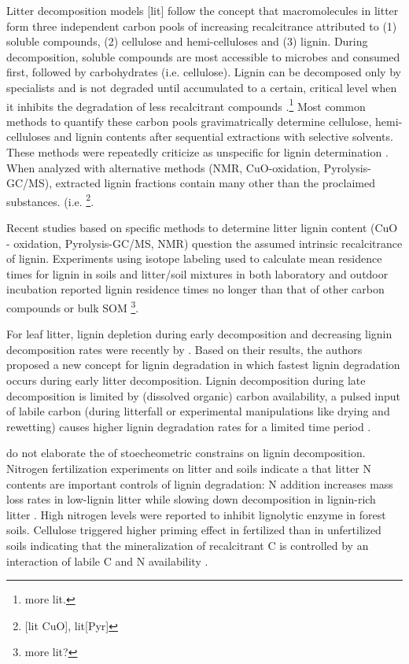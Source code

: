 \documentclass[authoryear,preprint,review,12pt]{elsarticle}
\begin{document}
Litter decomposition models [lit] follow the concept that macromolecules in litter form three independent carbon pools of increasing recalcitrance attributed to (1) soluble compounds, (2) cellulose and hemi-celluloses and (3) lignin. During decomposition, soluble compounds are most accessible to microbes and consumed first, followed by carbohydrates (i.e. cellulose). Lignin can be decomposed only by specialists and is not degraded until accumulated to a certain, critical level when it inhibits the degradation of less recalcitrant compounds \citep{Berg1980, Couteaux1995, Moorhead2006}.\footnote{more lit.} Most common methods to quantify these carbon pools gravimatrically determine cellulose, hemi-celluloses and lignin contents after sequential extractions with selective solvents. These methods were repeatedly criticize as unspecific for lignin determination \citep{Hatfield2005}. When analyzed with alternative methods (NMR, CuO-oxidation, Pyrolysis-GC/MS), extracted lignin fractions contain many other than the proclaimed substances. (i.e. \cite{Preston1997} \footnote{[lit CuO], lit[Pyr]}. 

Recent studies based on specific methods to determine litter lignin content (CuO - oxidation, Pyrolysis-GC/MS, NMR) question the assumed intrinsic recalcitrance of lignin. Experiments using isotope labeling used to calculate mean residence times for lignin in soils and litter/soil mixtures in both laboratory and outdoor incubation reported lignin residence times no longer than that of other carbon compounds or bulk SOM \citep{Thevenot2010a, Bol2009}\footnote{more lit?}.

For leaf litter, lignin depletion during early decomposition and decreasing lignin decomposition rates were recently by \cite{Klotzbucher2011}. Based on their results, the authors proposed a new concept for lignin degradation in which fastest lignin degradation occurs during early litter decomposition. Lignin decomposition during late decomposition is limited by (dissolved organic) carbon availability, a pulsed input of labile carbon (during litterfall or experimental manipulations like drying and rewetting) causes higher lignin degradation rates for a limited time period .

\cite{Klotzbucher2011} do not elaborate the of stoecheometric constrains on lignin decomposition. Nitrogen fertilization experiments on litter and soils indicate a that litter N contents are important controls of lignin degradation: N addition increases mass loss rates in low-lignin litter while slowing down decomposition in lignin-rich litter \citep{Knorr2005}. High nitrogen levels were reported to inhibit lignolytic enzyme in forest soils\citep{Sinsabaugh2010}. Cellulose triggered higher priming effect in fertilized than in unfertilized soils indicating that the mineralization of recalcitrant C is controlled by an interaction of labile C and N availability \citep{Fontaine2011}.
\end{document}
